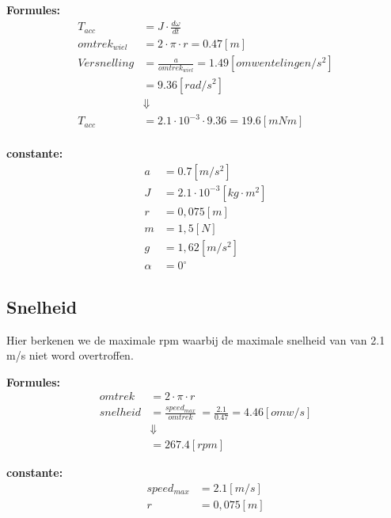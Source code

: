     \begin{multicols}{2}
        \textbf{Formules:}
        \begin{equation}
            \begin{split}
                T_{acc} &= J \cdot \frac{d \omega}{dt} \\
                omtrek_{wiel} &= 2 \cdot \pi \cdot r = 0.47 [m] \\
                Versnelling &= \frac{a}{omtrek_{wiel}} = 1.49 [omwentelingen/s^2] \\
                &= 9.36 [rad/s^2] \\
                &\Downarrow \\
                T_{acc} &= 2.1 \cdot 10^{-3} \cdot 9.36 = 19.6 [mNm]\\
            \end{split}
        \end{equation}

        \textbf{constante:}
        \begin{equation*}
            \begin{split}
                a &= 0.7 [m/s^2] \\
                J &= 2.1 \cdot 10^{-3} [kg \cdot m^2]\\
                r &= 0,075 [m] \\
                m &= 1,5 [N] \\
                g &= 1,62 [m/s^2] \\
                \alpha &= 0^\circ 
            \end{split}
        \end{equation*}
    \end{multicols}

\subsection{Snelheid}
    Hier berkenen we de maximale rpm waarbij de maximale snelheid van van 2.1 m/s niet word overtroffen.

    \begin{multicols}{2}
        \textbf{Formules:}
        \begin{equation}
            \begin{split}
                omtrek &= 2 \cdot \pi \cdot r \\
                snelheid &= \frac{speed_{max}}{omtrek}\ = \frac{2.1}{0.47} = 4.46 [omw/s]\\
                &\Downarrow \\
                 &= 267.4 [rpm]
            \end{split}
        \end{equation}

        \textbf{constante:}
        \begin{equation*}
            \begin{split}
                speed_{max} &= 2.1 [m/s]\\
                r &= 0,075 [m] 
            \end{split}
        \end{equation*}
    \end{multicols}

